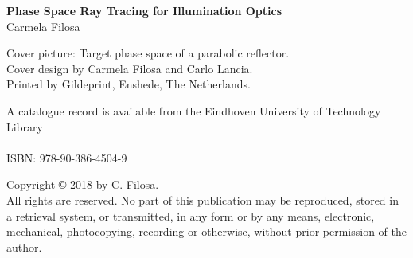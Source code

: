 
\thispagestyle{plain}

\vspace*{4cm}

\begin{center}
{\Huge \textbf{Phase Space Ray Tracing for Illumination Optics}}\\
\vspace{1cm}
{\huge{Carmela Filosa}}
\end{center}



\clearpage
\thispagestyle{plain}

\vspace*{\fill}



\noindent Cover picture: Target phase space of a parabolic reflector. \\
Cover design by Carmela Filosa and Carlo Lancia.  \\
Printed by Gildeprint, Enshede, The Netherlands.

\vspace{1cm}

\noindent A catalogue record is available from the Eindhoven University of Technology Library\\
\\
\noindent ISBN:  978-90-386-4504-9\\

\vspace{1cm}

\noindent Copyright \copyright{} 2018 by C. Filosa. \\
All rights are reserved.
No part of this publication may be reproduced, stored in a retrieval system, or transmitted, in any form or by any means, electronic, mechanical, photocopying, recording or otherwise, without prior permission of the author.

\clearpage


\thispagestyle{plain}

